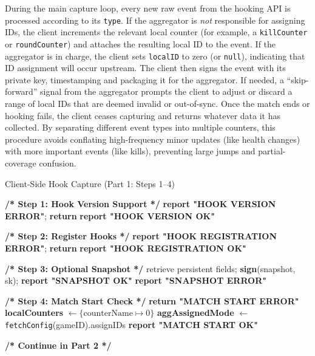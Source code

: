 \documentclass[11pt]{article}
\begin{document}
During the main capture loop, every new raw event from the hooking API is processed according to its \texttt{type}. If the aggregator is \emph{not} responsible for assigning IDs, the client increments the relevant local counter (for example, a \texttt{killCounter} or \texttt{roundCounter}) and attaches the resulting local ID to the event. If the aggregator is in charge, the client sets \texttt{localID} to zero (or \texttt{null}), indicating that ID assignment will occur upstream. The client then signs the event with its private key, timestamping and packaging it for the aggregator. If needed, a “skip-forward” signal from the aggregator prompts the client to adjust or discard a range of local IDs that are deemed invalid or out-of-sync. Once the match ends or hooking fails, the client ceases capturing and returns whatever data it has collected. By separating different event types into multiple counters, this procedure avoids conflating high-frequency minor updates (like health changes) with more important events (like kills), preventing large jumps and partial-coverage confusion.


\begin{algorithm}[H]
\scriptsize
\caption{Client-Side Hook Capture (Part 1: Steps 1--4)}
\label{algo:clientHookCapture-part1}
\begin{algorithmic}[1]
  \State \textbf{/* Step 1: Hook Version Support */}
      \State \textbf{report "HOOK VERSION ERROR"}; \textbf{return}
    \EndIf
  \EndFor
  \State \textbf{report "HOOK VERSION OK"}

  \State \textbf{/* Step 2: Register Hooks */}
    \State \textbf{report "HOOK REGISTRATION ERROR"}; \textbf{return}
  \Else
    \State \textbf{report "HOOK REGISTRATION OK"}
  \EndIf

  \State \textbf{/* Step 3: Optional Snapshot */}
    \State retrieve persistent fields; \textbf{sign}(snapshot, sk); \textbf{report "SNAPSHOT OK"}
  \Else
    \State \textbf{report "SNAPSHOT ERROR"} 
  \EndIf

  \State \textbf{/* Step 4: Match Start Check */}
    \State \textbf{return "MATCH START ERROR"}
  \Else
    \State \textbf{localCounters} $\gets \{\text{counterName} \mapsto 0\}$
    \State \textbf{aggAssignedMode} $\gets$ \texttt{fetchConfig}(gameID).assignIDs 
    \State \textbf{report "MATCH START OK"}
  \EndIf

  \State \textbf{/* Continue in Part 2 */}
  \EndProcedure
\end{algorithmic}
\end{algorithm}
\end{document}
